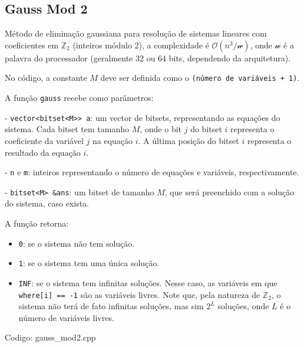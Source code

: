 \documentclass[10pt, a4paper, oneside]{book}
\begin{document}
\subsection{Gauss Mod 2}


Método de eliminação gaussiana para resolução de sistemas lineares com coeficientes em $\mathbb{Z}_2$ (inteiros módulo 2), a complexidade é $\mathcal{O}(n^3 / \mathcal{w})$, onde $\mathcal{w}$ é a palavra do processador (geralmente 32 ou 64 bits, dependendo da arquitetura).



No código, a constante $M$ deve ser definida como o \texttt{(número de variáveis + 1)}.



A função \texttt{gauss} recebe como parâmetros:

 - \texttt{vector<bitset<M>> a}: um vector de bitsets, representando as equações do sistema. Cada bitset tem tamanho $M$, onde o bit $j$ do bitset $i$ representa o coeficiente da variável $j$ na equação $i$. A última posição do bitset $i$ representa o resultado da equação $i$.

 - \texttt{n} e \texttt{m}: inteiros representando o número de equações e variáveis, respectivamente.

 - \texttt{bitset<M> \&ans}: um bitset de tamanho $M$, que será preenchido com a solução do sistema, caso exista.



A função retorna:

\begin{itemize}
\item \texttt{0}: se o sistema não tem solução.
\item \texttt{1}: se o sistema tem uma única solução.
\item \texttt{INF}: se o sistema tem infinitas soluções. Nesse caso, as variáveis em que \texttt{where[i] == -1} são as variáveis livres. Note que, pela natureza de $\mathbb{Z}_2$, o sistema não terá de fato infinitas soluções, mas sim $2^L$ soluções, onde $L$ é o número de variáveis livres.
\end{itemize}

\hfill

Codigo: gauss\_mod2.cpp
\end{document}
